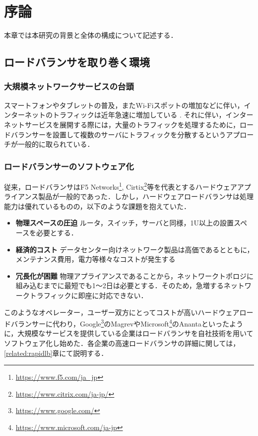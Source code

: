\chapter{序論}
\label{introduction}
本章では本研究の背景と全体の構成について記述する．

\section{ロードバランサを取り巻く環境}
\label{introduction:background}

\subsection{大規模ネットワークサービスの台頭}
スマートフォンやタブレットの普及，またWi-Fiスポットの増加などに伴い，インターネットのトラフィックは近年急速に増加している \cite{Cisco_Analysis}.
それに伴い，インターネットサービスを展開する際には，大量のトラフィックを処理するために，ロードバランサーを設置して複数のサーバにトラフィックを分散するというアプローチが一般的に取られている．

\subsection{ロードバランサーのソフトウェア化}
\label{introduction:background:software_lb}
従来，ロードバランサはF5 Networks\footnote{\url{https://www.f5.com/ja_jp}}, Cirtix\footnote{\url{https://www.citrix.com/ja-jp/}}等を代表とするハードウェアアプライアンス製品が一般的であった．しかし，ハードウェアロードバランサは処理能力は優れているものの，以下のような課題を抱えていた．
\begin{itemize}
    \item \textbf{物理スペースの圧迫}
    ルータ，スイッチ，サーバと同様，1U以上の設置スペースを必要とする．
    \item \textbf{経済的コスト}
    データセンター向けネットワーク製品は高価であるとともに，メンテナンス費用，電力等様々なコストが発生する
    \item \textbf{冗長化が困難}
    物理アプライアンスであることから，ネットワークトポロジに組み込むまでに最短でも1〜2日は必要とする．そのため，急増するネットワークトラフィックに即座に対応できない．
\end{itemize}

このようなオペレーター，ユーザー双方にとってコストが高いハードウェアロードバランサーに代わり，Google\footnote{\url{https://www.google.com/}}のMagrev\cite{Magrev}やMicrosoft\footnote{\url{https://www.microsoft.com/ja-jp}}のAnanta\cite{ananta}といったように，大規模なサービスを提供している企業はロードバランサを自社技術を用いてソフトウェア化し始めた．各企業の高速ロードバランサの詳細に関しては，\ref{related:rapidlb}章にて説明する．

